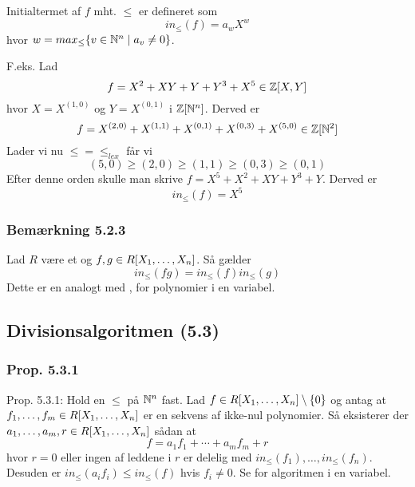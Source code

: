 Initialtermet af $f$ mht. $\leq$ er defineret som
\begin{equation*}
  in_{\leq}(f) = a_w X^w
\end{equation*}
hvor $w = max_{\leq}\{ v \in \mathbb{N}^n \mid a_v \neq 0 \}$.

F.eks. Lad
\begin{equation*}
  f = X^2 + XY + Y + Y^3 + X^5 \in \mathbb{Z}[X,Y]
\end{equation*}
hvor $X = X^{(1,0)}$ og $Y = X^{(0,1)}$ i $\mathbb{Z}[\mathbb{N}^n]$. Derved er
\begin{equation*}
  f = X^{(2,0)} + X^{(1,1)} + X^{(0,1)} + X^{(0,3)} + X^{(5,0)} \in \mathbb{Z}[\mathbb{N}^2]
\end{equation*}
Lader vi nu $\leq = \leq_{lex}$ får vi
\begin{equation*}
  (5,0) \geq (2,0) \geq (1,1) \geq (0,3) \geq (0,1)
\end{equation*}
Efter denne orden skulle man skrive $f = X^5 + X^2 + XY + Y^3 + Y$. Derved er
\begin{equation*}
  in_{\leq}(f) = X^5
\end{equation*}

\subsubsection{Bemærkning 5.2.3}
\label{Bemaerkning 5.2.3}
Lad $R$ være et  og $f,g \in R[X_1,\ldots,X_n]$.
Så gælder
\begin{equation*}
  in_{\leq}(fg) = in_{\leq}(f)in_{\leq}(g)
\end{equation*}
Dette er en analogt med , for polynomier i en variabel.

\subsection{Divisionsalgoritmen (5.3)}
\label{Divisionsalgoritmen (5.3)}
\subsubsection{Prop. 5.3.1}
\label{Prop. 5.3.1}
Prop. 5.3.1: Hold en  $\leq$ på $\mathbb{N}^n$ fast. Lad $f \in
R[X_1,\ldots,X_n] \setminus \{ 0 \}$ og antag at $f_1,\ldots,f_m \in
R[X_1,\ldots,X_n]$ er en sekvens af ikke-nul polynomier. Så eksisterer der
$a_1,\ldots,a_m, r \in R[X_1,\ldots,X_n]$ sådan at
\begin{equation*}
  f = a_1 f_1 + \cdots + a_m f_m + r
\end{equation*}
hvor $r = 0$ eller ingen af leddene i $r$ er delelig med
$in_{\leq}(f_1),\ldots,in_{\leq}(f_n)$. Desuden er $in_{\leq}(a_i f_i) \leq
in_{\leq}(f)$ hvis $f_i \neq 0$. Se  for algoritmen i en
variabel.

